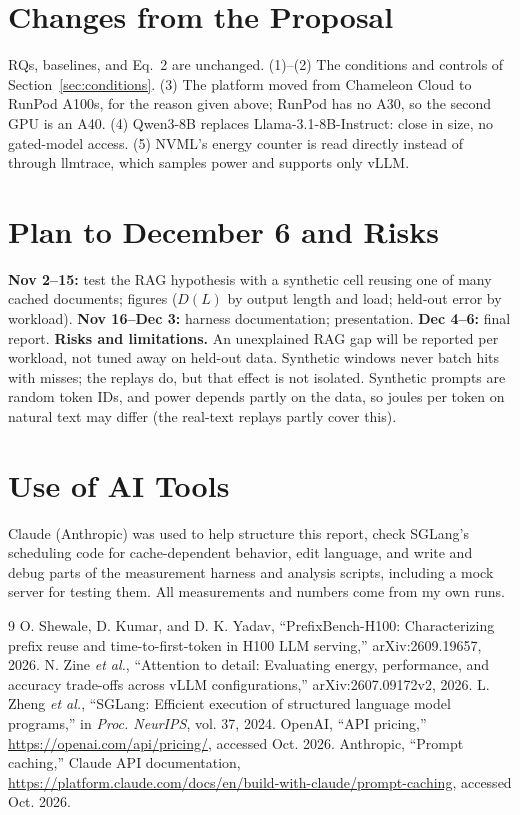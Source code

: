 \documentclass[conference]{IEEEtran}
\begin{document}
\section{Changes from the Proposal}
RQs, baselines, and Eq.~2 are unchanged. (1)--(2) The conditions and controls of Section~\ref{sec:conditions}. (3) The platform moved from Chameleon Cloud to RunPod A100s, for the reason given above; RunPod has no A30, so the second GPU is an A40. (4) Qwen3-8B replaces Llama-3.1-8B-Instruct: close in size, no gated-model access. (5) NVML's energy counter is read directly instead of through llmtrace, which samples power and supports only vLLM.

\section{Plan to December 6 and Risks}
\textbf{Nov 2--15:} test the RAG hypothesis with a synthetic cell reusing one of many cached documents; figures ($D(L)$ by output length and load; held-out error by workload). \textbf{Nov 16--Dec 3:} harness documentation; presentation. \textbf{Dec 4--6:} final report.
\textbf{Risks and limitations.} An unexplained RAG gap will be reported per workload, not tuned away on held-out data. Synthetic windows never batch hits with misses; the replays do, but that effect is not isolated. Synthetic prompts are random token IDs, and power depends partly on the data, so joules per token on natural text may differ (the real-text replays partly cover this).

\section*{Use of AI Tools}
Claude (Anthropic) was used to help structure this report, check SGLang's scheduling code for cache-dependent behavior, edit language, and write and debug parts of the measurement harness and analysis scripts, including a mock server for testing them. All measurements and numbers come from my own runs.

\begin{thebibliography}{9}
\footnotesize
{} O. Shewale, D. Kumar, and D. K. Yadav, ``PrefixBench-H100: Characterizing prefix reuse and time-to-first-token in H100 LLM serving,'' arXiv:2609.19657, 2026.
 N. Zine \emph{et al.}, ``Attention to detail: Evaluating energy, performance, and accuracy trade-offs across vLLM configurations,'' arXiv:2607.09172v2, 2026.
 L. Zheng \emph{et al.}, ``SGLang: Efficient execution of structured language model programs,'' in \emph{Proc. NeurIPS}, vol. 37, 2024.
 OpenAI, ``API pricing,'' \url{https://openai.com/api/pricing/}, accessed Oct. 2026.
 Anthropic, ``Prompt caching,'' Claude API documentation, \url{https://platform.claude.com/docs/en/build-with-claude/prompt-caching}, accessed Oct. 2026.
\end{thebibliography}
\end{document}
